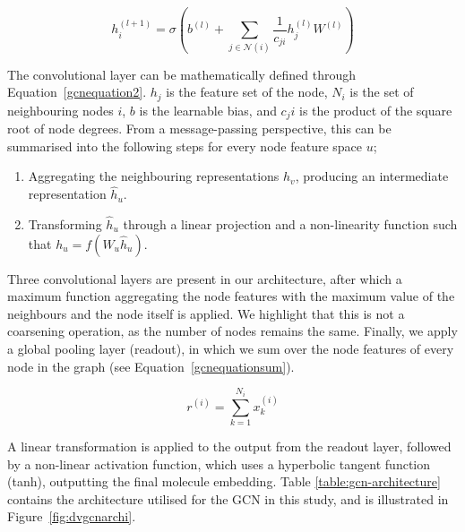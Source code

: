 \documentclass[journal=jcisd8,manuscript=article]{achemso} %
\begin{document}
\begin{equation}
    \label{gcnequation2}
    h_i^{(l+1)} = \sigma(b^{(l)} + \sum_{j\in\mathcal{N}(i)}\frac{1}{c_{ji}}h_j^{(l)}W^{(l)})
\end{equation}

The convolutional layer can be mathematically defined through Equation~\ref{gcnequation2}. $h_j$ is the feature set of the node, $N_i$ is the set of neighbouring nodes $i$, $b$ is the learnable bias, and $c_ji$ is the product of the square root of node degrees. From a message-passing perspective, this can be summarised into the following steps for every node feature space $u$;

\begin{enumerate}
    \item Aggregating the neighbouring representations $h_v$, producing an intermediate representation $\hat{h}_u$.
    \item Transforming $\hat{h}_u$ through a linear projection and a non-linearity function such that $h_u = f(W_u \hat{h}_u)$. \citep{kipf2016semi}
\end{enumerate}

Three convolutional layers are present in our architecture, after which a maximum function aggregating the node features with the maximum value of the neighbours and the node itself is applied. We highlight that this is not a coarsening operation, as the number of nodes remains the same. Finally, we apply a global pooling layer (readout), in which we sum over the node features of every node in the graph (see Equation~\ref{gcnequationsum}). 

\begin{equation}
    \label{gcnequationsum}
    r^{(i)} = \sum_{k=1}^{N_i} x^{(i)}_k
\end{equation}

A linear transformation is applied to the output from the readout layer, followed by a non-linear activation function, which uses a hyperbolic tangent function (tanh), outputting the final molecule embedding. Table \ref{table:gcn-architecture} contains the architecture utilised for the GCN in this study, and is illustrated in Figure~\ref{fig:dvgcnarchi}.
\end{document}
